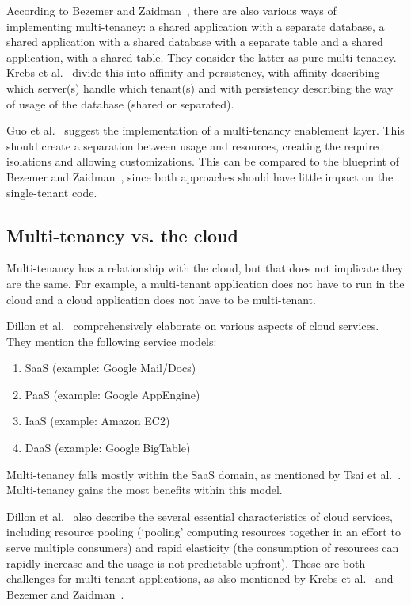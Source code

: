 According to Bezemer and Zaidman~\cite{bezemer2010multi}, there are also various ways of implementing multi-tenancy: a shared application with a separate database, a shared application with a shared database with a separate table and a shared application, with a shared table. They consider the latter as pure multi-tenancy. Krebs et al.~\cite{krebs2012architecture} divide this into affinity and persistency, with affinity describing which server(s) handle which tenant(s) and with persistency describing the way of usage of the database (shared or separated).

Guo et al.~\cite{guo2007framework} suggest the implementation of a multi-tenancy enablement layer. This should create a separation between usage and resources, creating the required isolations and allowing customizations. This can be compared to the blueprint of Bezemer and Zaidman~\cite{bezemer2010multi}, since both approaches should have little impact on the single-tenant code.

\subsection{Multi-tenancy vs. the cloud}

Multi-tenancy has a relationship with the cloud, but that does not implicate they are the same. For example, a multi-tenant application does not have to run in the cloud and a cloud application does not have to be multi-tenant.

Dillon et al.~\cite{dillon2010cloud} comprehensively elaborate on various aspects of cloud services. They mention the following service models: 
\begin{enumerate}
\item \acf{SaaS} (example: Google Mail/Docs)
\item \acf{PaaS} (example: Google AppEngine)
\item \acf{IaaS} (example: Amazon EC2)
\item \acf{DaaS} (example: Google BigTable)
\end{enumerate}

Multi-tenancy falls mostly within the \ac{SaaS} domain, as mentioned by Tsai et al.~\cite{tsai2010towards}. Multi-tenancy gains the most benefits within this model.

Dillon et al.~\cite{dillon2010cloud} also describe the several essential characteristics of cloud services, including resource pooling (`pooling' computing resources together in an effort to serve multiple consumers) and rapid elasticity (the consumption of resources can rapidly increase and the usage is not predictable upfront). These are both challenges for multi-tenant applications, as also mentioned by Krebs et al.~\cite{krebs2012architecture} and Bezemer and Zaidman~\cite{bezemer2010multi}.

